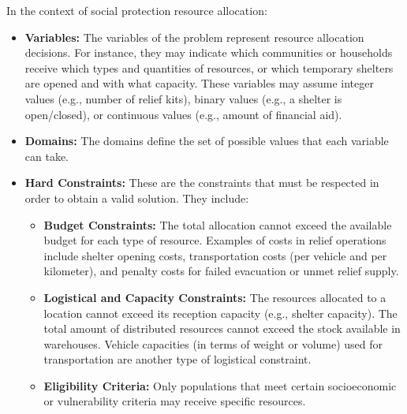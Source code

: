 \documentclass[letterpaper]{article}
\begin{document}
In the context of social protection resource allocation:
\begin{itemize}
    \item \textbf{Variables:} The variables of the problem represent resource allocation decisions. For instance, they may indicate which communities or households receive which types and quantities of resources, or which temporary shelters are opened and with what capacity. These variables may assume integer values (e.g., number of relief kits), binary values (e.g., a shelter is open/closed), or continuous values (e.g., amount of financial aid).

    \item \textbf{Domains:} The domains define the set of possible values that each variable can take.

    \item \textbf{Hard Constraints:} These are the constraints that must be respected in order to obtain a valid solution. They include:
          \begin{itemize}
              \item \textbf{Budget Constraints:} The total allocation cannot exceed the available budget for each type of resource. Examples of costs in relief operations include shelter opening costs, transportation costs (per vehicle and per kilometer), and penalty costs for failed evacuation or unmet relief supply.
              \item \textbf{Logistical and Capacity Constraints:} The resources allocated to a location cannot exceed its reception capacity (e.g., shelter capacity). The total amount of distributed resources cannot exceed the stock available in warehouses. Vehicle capacities (in terms of weight or volume) used for transportation are another type of logistical constraint.
              \item \textbf{Eligibility Criteria:} Only populations that meet certain socioeconomic or vulnerability criteria may receive specific resources.
          \end{itemize}


\end{itemize}
\end{document}
